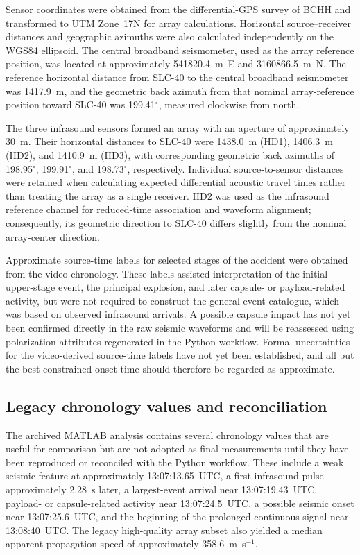 \documentclass[]{seismica}
\begin{document}
Sensor coordinates were obtained from the differential-GPS survey of BCHH and
transformed to UTM Zone~17N for array calculations. Horizontal
source--receiver distances and geographic azimuths were also calculated
independently on the WGS84 ellipsoid. The central broadband seismometer, used
as the array reference position, was located at approximately 541820.4~m~E and
3160866.5~m~N. The reference horizontal distance from SLC-40 to the central broadband
seismometer was 1417.9~m, and the geometric back azimuth from that nominal
array-reference position toward SLC-40 was 199.41$^\circ$, measured clockwise
from north.

The three infrasound sensors formed an array with an aperture of approximately
30~m. Their horizontal distances to SLC-40 were 1438.0~m (HD1), 1406.3~m
(HD2), and 1410.9~m (HD3), with corresponding geometric back azimuths of
198.95$^\circ$, 199.91$^\circ$, and 198.73$^\circ$, respectively. Individual
source-to-sensor distances were retained when calculating expected
differential acoustic travel times rather than treating the array as a single
receiver. HD2 was used as the infrasound reference channel for reduced-time
association and waveform alignment; consequently, its geometric direction to
SLC-40 differs slightly from the nominal array-center direction.

Approximate source-time labels for selected stages of the accident were
obtained from the video chronology. These labels assisted interpretation of the
initial upper-stage event, the principal explosion, and later
capsule- or payload-related activity, but were not required to construct the
general event catalogue, which was based on observed infrasound arrivals. A
possible capsule impact has not yet been confirmed directly in the raw seismic
waveforms and will be reassessed using polarization attributes regenerated in
the Python workflow. Formal uncertainties for the video-derived source-time
labels have not yet been established, and all but the best-constrained onset
time should therefore be regarded as approximate.

\subsection{Legacy chronology values and reconciliation}
\label{sec:methods_legacy_chronology}

The archived MATLAB analysis contains several chronology values that are useful
for comparison but are not adopted as final measurements until they have been
reproduced or reconciled with the Python workflow. These include a weak seismic
feature at approximately 13:07:13.65~UTC, a first infrasound pulse approximately
2.28~s later, a largest-event arrival near 13:07:19.43~UTC, payload- or
capsule-related activity near 13:07:24.5~UTC, a possible seismic onset near
13:07:25.6~UTC, and the beginning of the prolonged continuous signal near
13:08:40~UTC. The legacy high-quality array subset also yielded a median
apparent propagation speed of approximately 358.6~m~s$^{-1}$.
\end{document}

